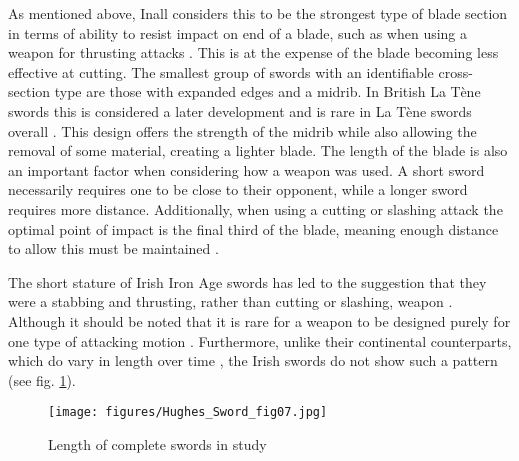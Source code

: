 As mentioned above, Inall considers this to be the strongest type of blade section in terms of ability to resist impact on end of a blade, 
such as when using a weapon for thrusting attacks \parencite[106]{Inall2009}. 
This is at the expense of the blade becoming less effective at cutting.
The smallest group of swords with an identifiable cross-section type are those with expanded edges and a midrib. 
In British La Tène swords this is considered a later development \parencite[9]{Stead2006} and is rare in La Tène swords overall \parencite[61]{Pleiner1993}. 
This design offers the strength of the midrib while also allowing the removal of some material, creating a lighter blade.
The length of the blade is also an important factor when considering how a weapon was used. 
A short sword necessarily requires one to be close to their opponent, while a longer sword requires more distance. 
Additionally, when using a cutting or slashing attack the optimal point of impact is the final third of the blade, 
meaning enough distance to allow this must be maintained \parencite[104\psq]{Inall2009}. 

The short stature of Irish Iron Age swords has led to the suggestion that they were a stabbing and thrusting, rather than cutting or slashing, weapon \parencites[121]{Raftery1989}[142]{Raftery1994}.
Although it should be noted that it is rare for a weapon to be designed purely for one type of attacking motion \parencite[168\psqq]{Clements2007}. 
Furthermore, unlike their continental counterparts, which do vary in length over time \parencites(for a detailed study c.f.)()[50\psqq]{Brunaux2004}[159--161]{Lejars2007}, 
the Irish swords do not show such a pattern (see fig. \ref{hughes_fig7}). 


\begin{figure}[!tb]%
\texttt{[image: figures/Hughes\_Sword\_fig07.jpg]} 
\caption{Length of complete swords in study}
\label{hughes_fig7}
\end{figure}

